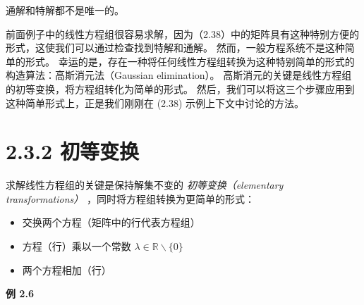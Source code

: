 通解和特解都不是唯一的。

前面例子中的线性方程组很容易求解，因为（2.38）中的矩阵具有这种特别方便的形式，这使我们可以通过检查找到特解和通解。 然而，一般方程系统不是这种简单的形式。 幸运的是，存在一种将任何线性方程组转换为这种特别简单的形式的构造算法：高斯消元法（Gaussian elimination）。 高斯消元的关键是线性方程组的初等变换，将方程组转化为简单的形式。 然后，我们可以将这三个步骤应用到这种简单形式上，正是我们刚刚在 (2.38) 示例上下文中讨论的方法。

\section*{2.3.2 初等变换}

求解线性方程组的关键是保持解集不变的 \emph{初等变换（elementary transformations）} ，同时将方程组转换为更简单的形式：

\begin{itemize}
\item 交换两个方程（矩阵中的行代表方程组）
\item 方程（行）乘以一个常数 $ \lambda \in \mathbb{R} \backslash \{0\} $ 
\item 两个方程相加（行）
\end{itemize}

\begin{notebox}
\textbf{例 2.6}
\end{notebox}

